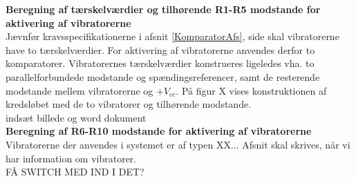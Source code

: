 \noindent\textbf{Beregning af tærskelværdier og tilhørende R1-R5 modstande for aktivering af  vibratorerne} \\
Jævnfør kravsspecifikationerne i afsnit \ref{KomparatorAfs}, side \pageref{KomparatorAfs} skal vibratorerne have to tærskelværdier. For aktivering af vibratorerne anvendes derfor to komparatorer. Vibratorernes tærskelværdier konstrueres ligeledes vha. to parallelforbundede modstande og spændingsreferencer, samt de resterende modstande mellem vibratorerne og $+V_{cc}$. På figur X vises konstruktionen af kredsløbet med de to vibratorer og tilhørende modstande. \\

indsæt billede og word dokument \\

\noindent\textbf{Beregning af R6-R10 modstande for aktivering af vibratorerne} \\
Vibratorerne der anvendes i systemet er af typen XX... Afsnit skal skrives, når vi har information om vibratorer.  \\

FÅ SWITCH MED IND I DET? \\

